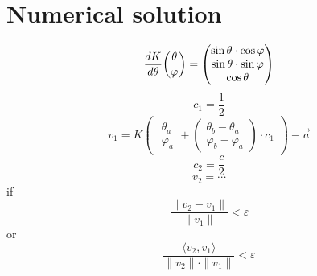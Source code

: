 \section{Numerical solution}
\begin{equation}
    \frac{dK}{d\theta}\dbinom{\theta}{\varphi}=
    \begin{pmatrix}
        \sin\theta\cdot\cos\varphi \\
        \sin\theta\cdot\sin\varphi \\
        \cos\theta
    \end{pmatrix}
\end{equation}
\begin{equation}
    c_1=\frac{1}{2}
\end{equation}
\begin{equation}
    v_1=K
    \begin{pmatrix}
        \begin{matrix}
            \theta_a \\
            \varphi_a
        \end{matrix}
        +
        \begin{pmatrix}
            \theta_b-\theta_a\\
            \varphi_b-\varphi_a
        \end{pmatrix}
        \cdot c_1
    \end{pmatrix} 
    -\vec{a}
\end{equation}
\begin{equation}
    c_2=\frac{c}{2}
\end{equation}
\begin{equation}
    v_2=\cdots
\end{equation}
if
\begin{equation}
    \frac{\|v_2-v_1\|}{\|v_1\|}<\varepsilon
\end{equation}
or
\begin{equation}
    \frac{\langle v_2, v_1\rangle}{\|v_2\|\cdot\|v_1\|}<\varepsilon
\end{equation}